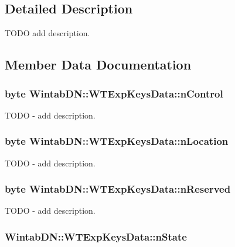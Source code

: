 \subsection{Detailed Description}
TODO add description. 

\subsection{Member Data Documentation}
\hypertarget{struct_wintab_d_n_1_1_w_t_exp_keys_data_a637276ea56c52346dbbe17ca6689318e}{
\subsubsection[{nControl}]{\setlength{\rightskip}{0pt plus 5cm}byte {\bf WintabDN::WTExpKeysData::nControl}}}
\label{struct_wintab_d_n_1_1_w_t_exp_keys_data_a637276ea56c52346dbbe17ca6689318e}


TODO -\/ add description. 

\hypertarget{struct_wintab_d_n_1_1_w_t_exp_keys_data_a29778f2d536164e9299dc9cb6effb89f}{
\subsubsection[{nLocation}]{\setlength{\rightskip}{0pt plus 5cm}byte {\bf WintabDN::WTExpKeysData::nLocation}}}
\label{struct_wintab_d_n_1_1_w_t_exp_keys_data_a29778f2d536164e9299dc9cb6effb89f}


TODO -\/ add description. 

\hypertarget{struct_wintab_d_n_1_1_w_t_exp_keys_data_ae75a2979fd97b1283dbe3ad657cbd3ee}{
\subsubsection[{nReserved}]{\setlength{\rightskip}{0pt plus 5cm}byte {\bf WintabDN::WTExpKeysData::nReserved}}}
\label{struct_wintab_d_n_1_1_w_t_exp_keys_data_ae75a2979fd97b1283dbe3ad657cbd3ee}


TODO -\/ add description. 

\hypertarget{struct_wintab_d_n_1_1_w_t_exp_keys_data_a2755fd9dd04805f4d3989a66ee309bf2}{
\subsubsection[{nState}]{ {\bf WintabDN::WTExpKeysData::nState}}}
\label{struct_wintab_d_n_1_1_w_t_exp_keys_data_a2755fd9dd04805f4d3989a66ee309bf2}


